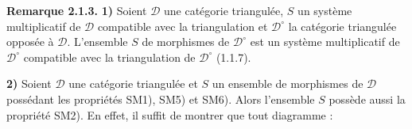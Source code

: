 \medskip
\noindent\textbf{Remarque 2.1.3.}\quad
{}
\textbf{1)} Soient $\mathcal D$ une catégorie triangulée, $S$ un système
multiplicatif de $\mathcal D$ compatible avec la triangulation et
$\mathcal D^\circ$ la catégorie triangulée opposée à $\mathcal D$. L'ensemble
$S$ de morphismes de $\mathcal D^\circ$ est un système multiplicatif de
$\mathcal D^\circ$ compatible avec la triangulation de $\mathcal D^\circ$
(1.1.7).

\smallskip
\noindent\textbf{2)} Soient $\mathcal D$ une catégorie triangulée et $S$ un
ensemble de morphismes de $\mathcal D$ possédant les propriétés SM1), SM5) et
SM6). Alors l'ensemble $S$ possède aussi la propriété SM2).
En effet, il suffit de montrer que tout diagramme :

\begin{center}
\end{center}
\endgroup
